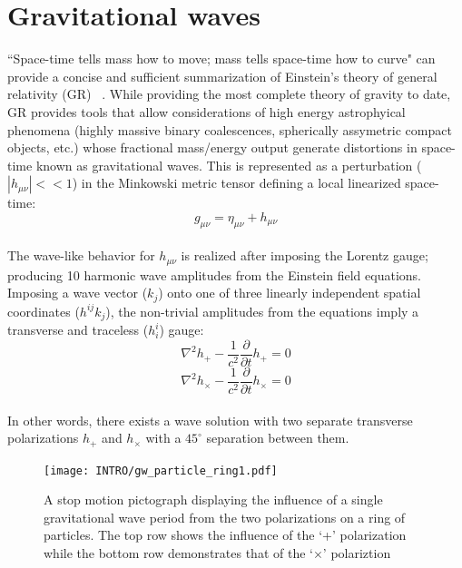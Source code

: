 


\section{Gravitational waves}
``Space-time tells mass how to move; mass tells space-time how to curve" can provide a concise and sufficient summarization of Einstein's theory of general relativity (GR) ~\cite{misner:1973}. While providing the most complete theory of gravity to date, GR provides tools that allow considerations of high energy astrophyical phenomena (highly massive binary coalescences, spherically assymetric compact objects, etc.) whose fractional mass/energy output generate distortions in space-time known as gravitational waves.
This is represented as a perturbation ($|h_{\mu \nu}|<<1$) in the Minkowski metric tensor defining a local linearized space-time:
\\
$$g_{\mu \nu} = \eta_{\mu \nu} + h_{\mu \nu}$$
\\
The wave-like behavior for $h_{\mu \nu}$ is realized after imposing the Lorentz gauge; producing 10 harmonic wave amplitudes from the Einstein field equations. Imposing a wave vector ($k_j$) onto one of three linearly independent spatial coordinates ($h^{ij}k_j$), the non-trivial amplitudes from the equations imply a transverse and traceless ($h^{i}_{i}$) gauge:
\\
$$\nabla^2 h_{+} - \frac{1}{c^2} \frac{\partial}{\partial t} h_{+} = 0$$
$$\nabla^2 h_{\times} - \frac{1}{c^2} \frac{\partial}{\partial t} h_{\times} = 0$$
\\
In other words, there exists a wave solution with two separate transverse polarizations $h_{+}$ and $h_{\times}$ with a $45^{\circ}$ separation between them. 

\begin{figure}[H]
	\texttt{[image: INTRO/gw\_particle\_ring1.pdf]}
	\caption{A stop motion pictograph displaying the influence of a single gravitational wave period from the two polarizations on a ring of particles. The top row shows the influence of the `+' polarization while the bottom row demonstrates that of the `$\times$' polariztion}	
	\label{fig:gwpolarizations}
\end{figure}

